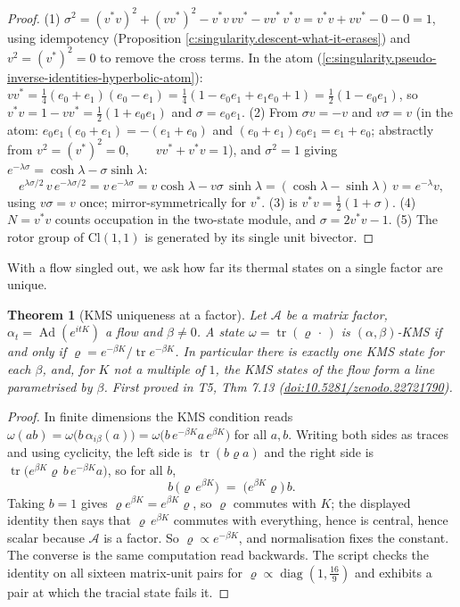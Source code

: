 \documentclass[11pt]{article}
\newtheorem{theorem}{Theorem}[section]
\theoremstyle{definition}
\theoremstyle{plain}
\providecommand{\Aa}{}\renewcommand{\Aa}{\mathcal{A}}
\providecommand{\Cl}{}\renewcommand{\Cl}{\mathrm{Cl}}
\providecommand{\tr}{}\renewcommand{\tr}{\operatorname{tr}}
\begin{document}
\begin{proof}
(1) $\sigma^2 = (v^*v)^2 + (vv^*)^2 - v^*v\,vv^* - vv^*\,v^*v = v^*v + vv^* - 0 - 0 = 1$, using idempotency (Proposition \ref{c:singularity.descent-what-it-erases}) and $v^2 = (v^*)^2 = 0$ to remove the cross terms. In the atom (\ref{c:singularity.pseudo-inverse-identities-hyperbolic-atom}): $v v^* = \tfrac14(e_0 + e_1)(e_0 - e_1) = \tfrac14(1 - e_0e_1 + e_1e_0 + 1) = \tfrac12(1 - e_0e_1)$, so $v^*v = 1 - vv^* = \tfrac12(1 + e_0e_1)$ and $\sigma = e_0 e_1$. (2) From $\sigma v = -v$ and $v\sigma = v$ (in the atom: $e_0e_1(e_0 + e_1) = -(e_1 + e_0)$ and $(e_0+e_1)e_0e_1 = e_1 + e_0$; abstractly from $v^2 = (v^*)^2 = 0, \qquad v v^* + v^* v = 1$), and $\sigma^2 = 1$ giving $e^{-\lambda\sigma} = \cosh\lambda - \sigma\sinh\lambda$:
\[
e^{\lambda\sigma/2}\,v\,e^{-\lambda\sigma/2} = v\,e^{-\lambda\sigma} = v\cosh\lambda - v\sigma\,\sinh\lambda = (\cosh\lambda - \sinh\lambda)\,v = e^{-\lambda}v ,
\]
using $v\sigma = v$ once; mirror-symmetrically for $v^*$. (3) is $v^*v = \tfrac12(1 + \sigma)$. (4) $N = v^*v$ counts occupation in the two-state module, and $\sigma = 2v^*v - 1$. (5) The rotor group of $\Cl(1,1)$ is generated by its single unit bivector.

\end{proof}

With a flow singled out, we ask how far its thermal states on a single factor are unique.

\begin{theorem}[KMS uniqueness at a factor]\label{c:singularity.kms-uniqueness-factor}
Let $\Aa$ be a matrix factor, $\alpha_t = \operatorname{Ad}(e^{itK})$ a flow and $\beta \neq 0$. A state $\omega = \tr(\varrho\,\cdot\,)$ is $(\alpha,\beta)$-KMS if and only if $\varrho = e^{-\beta K}/\tr e^{-\beta K}$. In particular there is exactly one KMS state for each $\beta$, and, for $K$ not a multiple of $1$, the KMS states of the flow form a line parametrised by $\beta$.
\emph{First proved in} T5, Thm 7.13 (\href{https://doi.org/10.5281/zenodo.22721790}{doi:10.5281/zenodo.22721790}).
\end{theorem}
\begin{proof}
In finite dimensions the KMS condition reads $\omega(ab) = \omega\bigl(b\,\alpha_{i\beta}(a)\bigr) = \omega\bigl(b\,e^{-\beta K}a\,e^{\beta K}\bigr)$ for all $a, b$. Writing both sides as traces and using cyclicity, the left side is $\tr(b\varrho a)$ and the right side is $\tr\bigl(e^{\beta K}\varrho\, b\, e^{-\beta K} a\bigr)$, so for all $b$,
\[
b\,\bigl(\varrho\, e^{\beta K}\bigr) \;=\; \bigl(e^{\beta K}\varrho\bigr)\, b .
\]
Taking $b = 1$ gives $\varrho e^{\beta K} = e^{\beta K}\varrho$, so $\varrho$ commutes with $K$; the displayed identity then says that $\varrho\,e^{\beta K}$ commutes with everything, hence is central, hence scalar because $\Aa$ is a factor. So $\varrho \propto e^{-\beta K}$, and normalisation fixes the constant. The converse is the same computation read backwards. The script checks the identity on all sixteen matrix-unit pairs for $\varrho \propto \operatorname{diag}(1, \tfrac{16}{9})$ and exhibits a pair at which the tracial state fails it.

\end{proof}
\end{document}

